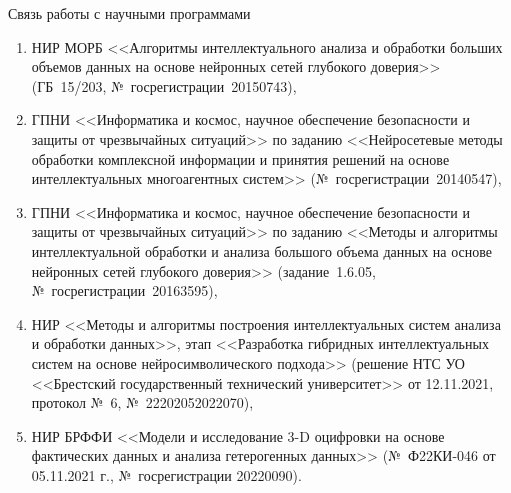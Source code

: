\documentclass[10pt]{beamer}
\begin{document}
        \begin{frame}{Связь работы с научными программами}
            \begin{enumerate}
                \item НИР МОРБ <<Алгоритмы интеллектуального анализа и обработки больших объемов данных на основе нейронных сетей глубокого доверия>> (ГБ~15/203, №~госрегистрации~20150743),
                \item ГПНИ <<Информатика и космос, научное обеспечение безопасности и защиты от чрезвычайных ситуаций>> по заданию <<Нейросетевые методы обработки комплексной информации и принятия решений на основе интеллектуальных многоагентных систем>> (№~госрегистрации~20140547),
                \item \small{ГПНИ <<Информатика и космос, научное обеспечение безопасности и защиты от чрезвычайных ситуаций>> по заданию <<Методы и алгоритмы интеллектуальной обработки и анализа большого объема данных на основе нейронных сетей глубокого доверия>> (задание~1.6.05, №~госрегистрации~20163595)},
                \item НИР <<Методы и алгоритмы построения интеллектуальных систем анализа и обработки данных>>, этап <<Разработка гибридных интеллектуальных систем на основе нейросимволического подхода>> (решение НТС УО <<Брестский государственный технический университет>> от 12.11.2021, протокол №~6, №~22202052022070),
                \item НИР БРФФИ <<Модели и исследование 3-D оцифровки на основе фактических данных и анализа гетерогенных данных>> (№~Ф22КИ-046 от 05.11.2021 г., №~госрегистрации 20220090).            
            \end{enumerate}
        \end{frame}
\end{document}
